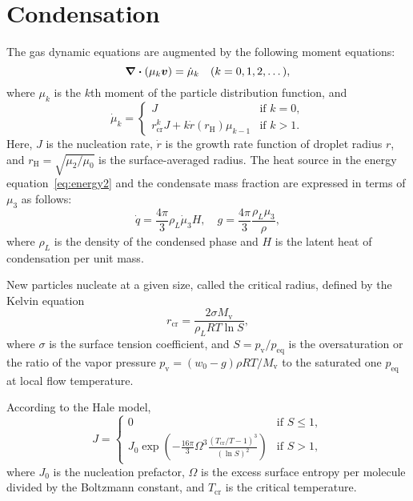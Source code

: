 \documentclass{article}
\newcommand{\vap}{\text{v}}
\newcommand{\eq}{\text{eq}}
\newcommand{\crit}[2][]{#2_\text{cr#1}}
\newcommand{\rH}{r_\text{H}}
\newcommand{\bv}{\vb*{v}}
\begin{document}
\section{Condensation}

The gas dynamic equations are augmented by the following moment equations:
\begin{equation}\label{eq:mu_k}
    \div(\mu_k\bv) = \dot{\mu}_k \quad (k=0,1,2,\dots),
\end{equation}
where $\mu_k$ is the $k$th moment of the particle distribution function, and
\begin{equation}\label{eq:dotmu}
    \dot\mu_k = \begin{cases}
        J &\text{if } k=0,\\
        \crit{r}^{k}J + k\dot{r}(\rH)\mu_{k-1} &\text{if } k>1.
    \end{cases}
\end{equation}
Here, $J$ is the nucleation rate, $\dot{r}$ is the growth rate function of droplet radius $r$,
and $\rH=\sqrt{\mu_2/\mu_0}$ is the surface-averaged radius.
The heat source in the energy equation~\eqref{eq:energy2}
and the condensate mass fraction are expressed in terms of $\mu_3$ as follows:
\begin{equation}\label{eq:dotq-g}
     \dot{q} = \frac{4\pi}{3}\rho_L\dot{\mu}_3H, \quad g = \frac{4\pi}{3} \frac{\rho_L\mu_3}{\rho},
\end{equation}
where $\rho_L$ is the density of the condensed phase
and $H$ is the latent heat of condensation per unit mass.

New particles nucleate at a given size, called the critical radius,
defined by the Kelvin equation
\begin{equation}\label{eq:r_crit}
     \crit{r} = \frac{2\sigma M_\vap}{\rho_L R T \ln S},
\end{equation}
where $\sigma$ is the surface tension coefficient,
and $S = p_\vap/p_\eq$ is the oversaturation or the ratio of the vapor pressure
$p_\vap = (w_0 - g)\rho RT/M_\vap$
to the saturated one $p_\eq$ at local flow temperature.

According to the Hale model,
\begin{equation}\label{eq:J}
    J = \begin{cases}
        0 &\text{if } S \leq 1,\\
        J_{0} \exp(-\frac{16\pi}{3}\Omega^3 \frac{(\crit{T}/T-1)^3}{(\ln S)^2}) &\text{if } S > 1,
    \end{cases}
\end{equation}
where $J_0$ is the nucleation prefactor,
$\Omega$ is the excess surface entropy per molecule divided by the Boltzmann constant,
and $\crit{T}$ is the critical temperature.
\end{document}
